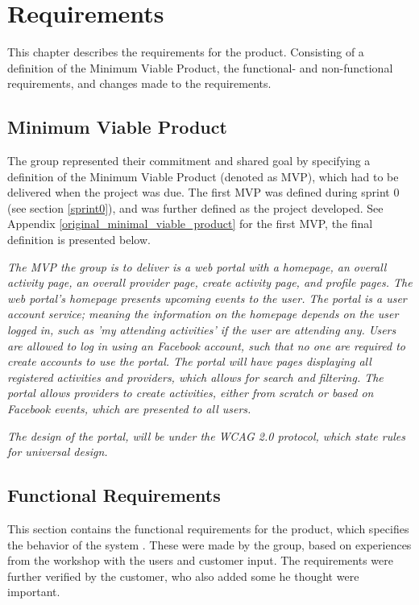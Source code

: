 
\chapter{Requirements}
\label{requirements}
This chapter describes the requirements for the product. Consisting of a definition of the Minimum Viable Product, the functional- and non-functional requirements, and changes made to the requirements.

\section{Minimum Viable Product}
\label{MVP}
The group represented their commitment and shared goal by specifying a definition of the Minimum Viable Product (denoted as MVP), which had to be delivered when the project was due. The first MVP was defined during sprint 0 (see section \ref{sprint0}), and was further defined as the project developed. See Appendix \ref{original_minimal_viable_product} for the first MVP, the final definition is presented below. 

\textit{The MVP the group is to deliver is a web portal with a homepage, an overall activity page, an overall provider page, create activity page, and profile pages. The web portal's homepage presents upcoming events to the user. The portal is a user account service; meaning the information on the homepage depends on the user logged in, such as 'my attending activities' if the user are attending any. Users are allowed to log in using an Facebook account, such that no one are required to create accounts to use the portal. The portal will have pages displaying all registered activities and providers, which allows for search and filtering. The portal allows providers to create activities, either from scratch or based on Facebook events, which are presented to all users.}

\textit{The design of the portal, will be under the WCAG 2.0 protocol, which state rules for universal design.}

\section{Functional Requirements}
\label{functional_requirements}
This section contains the functional requirements for the product, which specifies the behavior of the system \cite{requirements}. These were made by the group, based on experiences from the workshop with the users and customer input. The requirements were further verified by the customer, who also added some he thought were important. 

